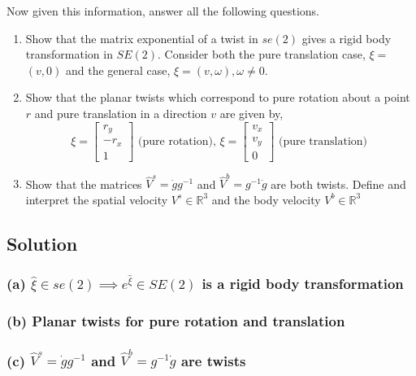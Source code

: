 Now given this information, answer all the following questions.
\begin{enumerate}[label= (\alph*)]
    \item Show that the matrix exponential of a twist in \( s e(2) \) gives a rigid body transformation in \( S E(2) \).
          Consider both the pure translation case, \( \xi= \) \( (v, 0) \) and the general case, \( \xi=(v, \omega), \omega \neq 0 \).
    \item Show that the planar twists which correspond to pure rotation about a point \( r \) and pure translation in a direction \( v \) are given by,
          \[
              \xi=\left[\begin{array}{c}
                      r_{y}  \\
                      -r_{x} \\
                      1
                  \end{array}\right] \text { (pure rotation), } \xi=\left[\begin{array}{c}
                      v_{x} \\
                      v_{y} \\
                      0
                  \end{array}\right] \text { (pure translation) }
          \]
    \item Show that the matrices \( \hat{V}^{s}=\dot{g} g^{-1} \) and \( \hat{V}^{b}=g^{-1} \dot{g} \) are both twists.
          Define and interpret the spatial velocity \( V^{s} \in \mathbb{R}^{3} \) and the body velocity \( V^{b} \in \mathbb{R}^{3} \)
\end{enumerate}

\clearpage
\subsection*{Solution}

\subsubsection*{(a) \( \hat{\xi} \in se(2) \implies e^{\hat{\xi}} \in SE(2) \) is a rigid body transformation}

\subsubsection*{(b) Planar twists for pure rotation and translation}

\subsubsection*{(c) \( \hat{V}^{s} = \dot{g} g^{-1} \) and \( \hat{V}^{b} = g^{-1} \dot{g} \) are twists}
